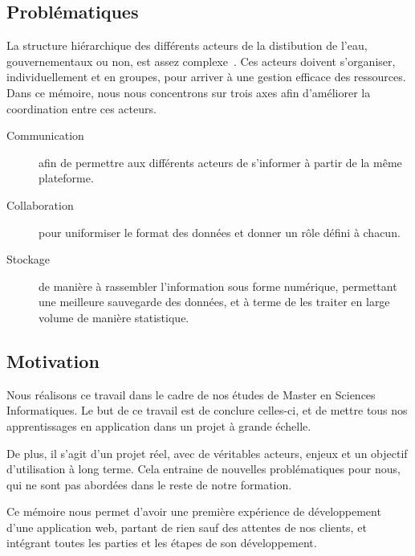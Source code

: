 \documentclass{EPL-master-thesis-covers-FR}
\begin{document}
		\subsection*{Problématiques}

			La structure hiérarchique des différents acteurs de la distibution de l'eau, gouvernementaux ou non, est assez complexe~\cite{ref:analyse_contextuelle_commune}. Ces acteurs doivent s'organiser, individuellement et en groupes, pour arriver à une gestion efficace des ressources. Dans ce mémoire, nous nous concentrons sur trois axes afin d'améliorer la coordination entre ces acteurs.

			\begin{description}
				\item[Communication] afin de permettre aux différents acteurs de s'informer à partir de la même plateforme.
				\item[Collaboration] pour uniformiser le format des données et donner un rôle défini à chacun.
				\item[Stockage] de manière à rassembler l'information sous forme numérique, permettant une meilleure sauvegarde des données, et à terme de les traiter en large volume de manière statistique.
			\end{description}

		\subsection*{Motivation}

			Nous réalisons ce travail dans le cadre de nos études de Master en Sciences Informatiques. Le but de ce travail est de conclure celles-ci, et de mettre tous nos apprentissages en application dans un projet à grande échelle.

			De plus, il s'agit d'un projet réel, avec de véritables acteurs, enjeux et un objectif d'utilisation à long terme. Cela entraine de nouvelles problématiques pour nous, qui ne sont pas abordées dans le reste de notre formation.

			Ce mémoire nous permet d'avoir une première expérience de développement d'une application web, partant de rien sauf des attentes de nos clients, et intégrant toutes les parties et les étapes de son développement.
\end{document}
